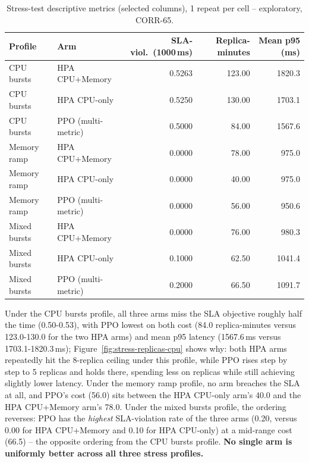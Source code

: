 \begin{table}[H]
\centering
\caption[Stress-test descriptive metrics]{Stress-test descriptive metrics (selected columns), 1 repeat per cell -- exploratory, CORR-65.}
\label{tab:stress-descriptive-main}
\small
\begin{tabular}{llrrr}
\toprule
Profile & Arm & SLA-viol.\ (1000\,ms) & Replica-minutes & Mean p95 (ms) \\
\midrule
CPU bursts & HPA CPU+Memory & 0.5263 & 123.00 & 1820.3 \\
CPU bursts & HPA CPU-only & 0.5250 & 130.00 & 1703.1 \\
CPU bursts & PPO (multi-metric) & 0.5000 & 84.00 & 1567.6 \\
Memory ramp & HPA CPU+Memory & 0.0000 & 78.00 & 975.0 \\
Memory ramp & HPA CPU-only & 0.0000 & 40.00 & 975.0 \\
Memory ramp & PPO (multi-metric) & 0.0000 & 56.00 & 950.6 \\
Mixed bursts & HPA CPU+Memory & 0.0000 & 76.00 & 980.3 \\
Mixed bursts & HPA CPU-only & 0.1000 & 62.50 & 1041.4 \\
Mixed bursts & PPO (multi-metric) & 0.2000 & 66.50 & 1091.7 \\
\bottomrule
\end{tabular}
\end{table}

Under the CPU bursts profile, all three arms miss the SLA objective
roughly half the time (0.50-0.53), with PPO lowest on both cost (84.0
replica-minutes versus 123.0-130.0 for the two HPA arms) and mean p95
latency (1567.6\,ms versus 1703.1-1820.3\,ms); Figure~\ref{fig:stress-replicas-cpu}
shows why: both HPA arms repeatedly hit the 8-replica ceiling under this
profile, while PPO rises step by step to 5 replicas and holds there,
spending less on replicas while still achieving slightly lower latency.
Under the memory ramp profile, no arm breaches the SLA at all, and PPO's
cost (56.0) sits between the HPA CPU-only arm's 40.0 and the HPA
CPU+Memory arm's 78.0. Under the mixed bursts profile, the ordering
reverses: PPO has the \emph{highest} SLA-violation rate of the three arms
(0.20, versus 0.00 for HPA CPU+Memory and 0.10 for HPA CPU-only) at a
mid-range cost (66.5) -- the opposite ordering from the CPU bursts profile.
\textbf{No single arm is uniformly better across all three stress
profiles.}

